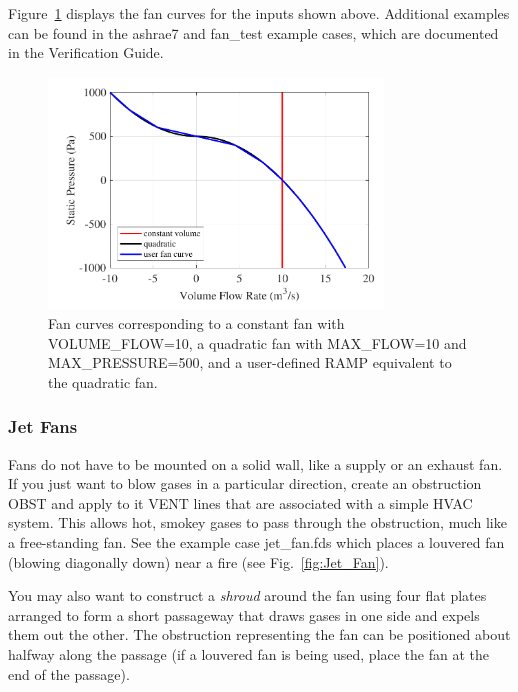 \documentclass[11pt]{book}
\begin{document}
Figure~\ref{fig:Fan_Curve} displays the fan curves for the inputs shown above.  Additional examples can be found in the {\ct ashrae7} and {\ct fan\_test} example cases, which are documented in the Verification Guide.

\begin{figure}[ht!]
\begin{center}
\includegraphics[width=3.5in]{SCRIPT_FIGURES/fan_curve}
\caption[Example of fan curves]{Fan curves corresponding to a constant fan with {\ct VOLUME\_FLOW=10}, a quadratic fan with {\ct MAX\_FLOW=10} and {\ct MAX\_PRESSURE=500}, and a user-defined {\ct RAMP} equivalent to the quadratic fan.}
\label{fig:Fan_Curve}
\end{center}
\end{figure}

\subsubsection{Jet Fans}

Fans do not have to be mounted on a solid wall, like a supply or an exhaust fan.
If you just want to blow gases in a particular direction, create an
obstruction {\ct OBST} and apply to it {\ct VENT} lines that are
associated with a simple HVAC system.
This allows hot, smokey gases to pass through the
obstruction, much like a free-standing fan.  See the example case {\ct jet\_fan.fds} which places a louvered fan (blowing diagonally down) near a fire (see Fig.~\ref{fig:Jet_Fan}).

You may also want to construct a {\em shroud} around the fan using four flat plates arranged to form
a short passageway that draws gases in one side and expels them out the other. The obstruction representing the fan can be positioned about halfway along the passage (if a louvered fan is being used, place the fan at the end of the passage).
\end{document}
